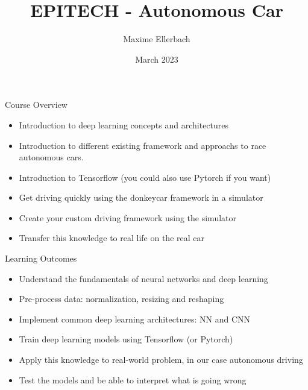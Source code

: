 \documentclass{beamer}
\title{EPITECH - Autonomous Car}
\author{Maxime Ellerbach}
\date{March 2023}
\begin{document}
\begin{frame}
    \titlepage
\end{frame}

\begin{frame}{Course Overview}
    \begin{itemize}
    \item Introduction to deep learning concepts and architectures
    \item Introduction to different existing framework and approachs to race autonomous cars.
    \item Introduction to Tensorflow (you could also use Pytorch if you want)
    \item Get driving quickly using the donkeycar framework in a simulator
    \item Create your custom driving framework using the simulator
    \item Transfer this knowledge to real life on the real car
    \end{itemize}
\end{frame}

\begin{frame}{Learning Outcomes}
    \begin{itemize}
    \item Understand the fundamentals of neural networks and deep learning
    \item Pre-process data: normalization, resizing and reshaping
    \item Implement common deep learning architectures: NN and CNN
    \item Train deep learning models using Tensorflow (or Pytorch)
    \item Apply this knowledge to real-world problem, in our case autonomous driving
    \item Test the models and be able to interpret what is going wrong
    \end{itemize}
\end{frame}

\begin{frame}{}
\end{frame}
\end{document}
